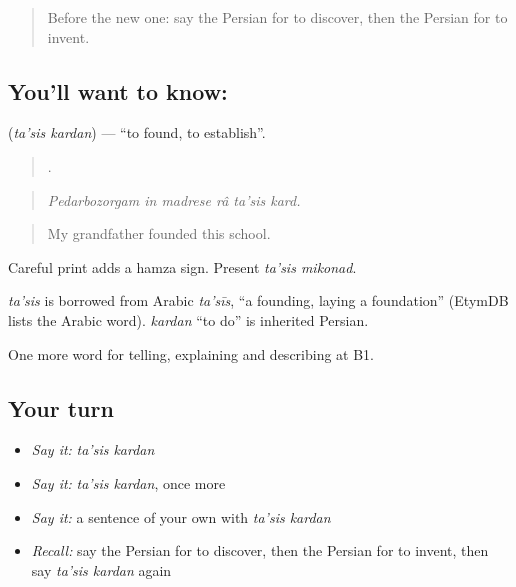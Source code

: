 \label{lesson:FA-C354-tasis-kardan}



\begin{quote}
Before the new one: say the Persian for to discover, then the Persian for to invent.
\end{quote}

\subsection*{You'll want to know:  }
\textbf{ } (\emph{ta'sis kardan}) — \textquotedblleft{}to found, to establish\textquotedblright{}.

\begin{quote}
     .
\end{quote}

\begin{quote}
\emph{Pedarbozorgam in madrese râ ta'sis kard.}
\end{quote}

\begin{quote}
My grandfather founded this school.
\end{quote}

Careful print adds a hamza sign. Present \emph{ta'sis mikonad}.

\begin{cousinweb}
\emph{ta'sis} is borrowed from Arabic \emph{ta'sīs}, \textquotedblleft{}a founding, laying a foundation\textquotedblright{} (EtymDB lists the Arabic word). \emph{kardan} \textquotedblleft{}to do\textquotedblright{} is inherited Persian.
\end{cousinweb}

\begin{grammarlens}[title={What you've built}]
One more word for telling, explaining and describing at B1.
\end{grammarlens}

\subsection*{Your turn}
\begin{itemize}
\raggedright
  \item \emph{Say it:} \emph{ta'sis kardan}
  \item \emph{Say it:} \emph{ta'sis kardan}, once more
  \item \emph{Say it:} a sentence of your own with \emph{ta'sis kardan}
  \item \emph{Recall:} say the Persian for to discover, then the Persian for to invent, then say \emph{ta'sis kardan} again
\end{itemize}

